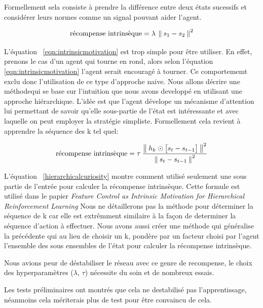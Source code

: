 Formellement sela consiste à prendre la différence entre deux états sucessifs et considérer leurs normes comme un signal pouvant aider l'agent.

\begin{equation}
\text{récompense intrinsèque} = \lambda \: \left\lVert\: s_1 - s_2 \:\right\rVert^2 
\label{eqn:intrinsicmotivation}
\end{equation}

L'équation ~\autoref{eqn:intrinsicmotivation} est trop simple pour être utiliser. En effet, prenons le cas d'un agent qui tourne en rond, alors selon l'équation \ref{eqn:intrinsicmotivation} l'agent serait encouragé à tourner. Ce comportememt exclu donc l'utilisation de ce type d'approche naive. Nous allons décrire une méthodequi se base sur l'intuition que nous avons developpé en utilisant une approche hiérarchique. L'idée est que l'agent dévelope un mécanisme d'attention lui permettant de savoir qu'elle sous-partie de l'état est intéressante et avec laquelle on peut employer la stratégie simpliste.
Formellement cela revient à apprendre la séquence des k tel quel:

\begin{equation} 
    \text{récompense intrinsèque} = \tau\: \frac{\left\lVert\: h_k \odot \big[ s_t - s_{t-1} \big] \:\right\rVert^2}{\left\lVert\: s_t - s_{t-1}   \:\right\rVert^2}  
\end{equation}

L'équation ~\eqref{hierarchicalcuriosity} montre comment utilisé seulement une sous partie de l'entrée pour calculer la récompense intrinsèque. Cette formule est utilisé dans le papier \emph{Feature Control as Intrinsic Motivation for Hierarchical Reinforcement Learning}\cite{hierarchicalcuriosity}
Nous ne détaillerons pas la méthode pour déterminer la séquence de k car elle est extrêmment similaire à la façon de determiner la séquence d'action à effectuer. Nous avons aussi créer une méthode qui généralise la précédente qui au lieu de choisir un k, pondère par un facteur choisi par l'agent l'ensemble des sous ensembles de l'état pour calculer la récompense intrinsèque.

Nous avions peur de déstabiliser le réseau avec ce genre de recompense, le choix des hyperparamètres ($\lambda$, $\tau$) nécessite du soin et de nombreux essais.

Les tests préliminaires ont montrés que cela ne destabilisé pas l'apprentissage, néanmoins cela mériterais plus de test pour être convaincu de cela.

